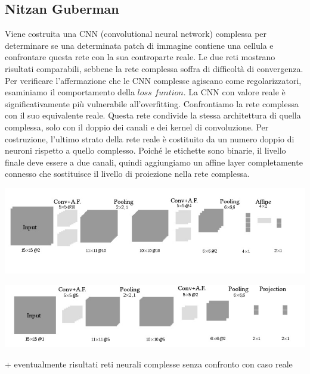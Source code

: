 \documentclass[a4paper,10pt]{article}
\begin{document}
 \subsection{Nitzan Guberman}
 
 Viene costruita una CNN (convolutional neural network) complessa per determinare se una determinata patch di immagine contiene una cellula e confrontare questa rete con la sua controparte reale. Le due reti mostrano risultati comparabili, sebbene la rete complessa soffra di difficoltà di convergenza. Per verificare l'affermazione che le CNN complesse agiscano come regolarizzatori, esaminiamo il comportamento della $loss$ $funtion$. La CNN con valore reale è significativamente più vulnerabile all'overfitting. Confrontiamo la rete complessa con il suo equivalente reale. Questa rete condivide la stessa architettura di quella complessa, solo con il doppio dei canali e dei kernel di convoluzione. Per costruzione, l'ultimo strato della rete reale è costituito da un numero doppio di neuroni rispetto a quello complesso. Poiché le etichette sono binarie, il livello finale deve essere a due canali, quindi aggiungiamo un affine layer completamente connesso che sostituisce il livello di proiezione nella rete complessa. 
 
 \includegraphics[width=%
\textwidth]{RCNN}

\includegraphics[width=%
\textwidth]{CCNN}

+ eventualmente risultati reti neurali complesse senza confronto con caso reale
\end{document}
